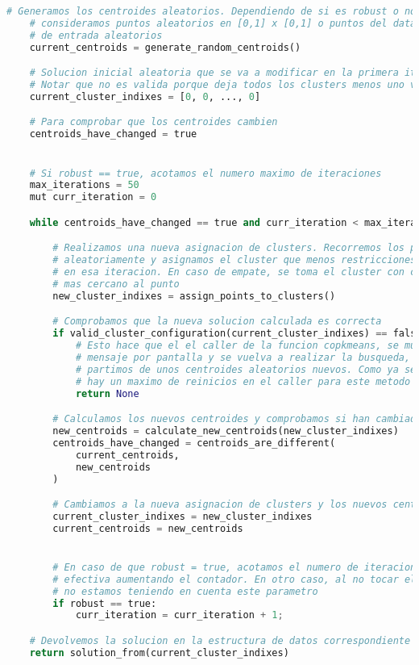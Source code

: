 \documentclass[11pt]{article}
\begin{document}
    \begin{lstlisting}[language=Python, style=Boxed]
    # Generamos los centroides aleatorios. Dependiendo de si es robust o no
    # consideramos puntos aleatorios en [0,1] x [0,1] o puntos del dataset
    # de entrada aleatorios
    current_centroids = generate_random_centroids()

    # Solucion inicial aleatoria que se va a modificar en la primera iteracion
    # Notar que no es valida porque deja todos los clusters menos uno vacíos
    current_cluster_indixes = [0, 0, ..., 0]

    # Para comprobar que los centroides cambien
    centroids_have_changed = true


    # Si robust == true, acotamos el numero maximo de iteraciones
    max_iterations = 50
    mut curr_iteration = 0

    while centroids_have_changed == true and curr_iteration < max_iterations{

        # Realizamos una nueva asignacion de clusters. Recorremos los puntos
        # aleatoriamente y asignamos el cluster que menos restricciones viole
        # en esa iteracion. En caso de empate, se toma el cluster con centroide
        # mas cercano al punto
        new_cluster_indixes = assign_points_to_clusters()

        # Comprobamos que la nueva solucion calculada es correcta
        if valid_cluster_configuration(current_cluster_indixes) == false:
            # Esto hace que el el caller de la funcion copkmeans, se muestre un
            # mensaje por pantalla y se vuelva a realizar la busqueda, con lo que
            # partimos de unos centroides aleatorios nuevos. Como ya se ha comentado,
            # hay un maximo de reinicios en el caller para este metodo
            return None

        # Calculamos los nuevos centroides y comprobamos si han cambiado
        new_centroids = calculate_new_centroids(new_cluster_indixes)
        centroids_have_changed = centroids_are_different(
            current_centroids,
            new_centroids
        )

        # Cambiamos a la nueva asignacion de clusters y los nuevos centroides
        current_cluster_indixes = new_cluster_indixes
        current_centroids = new_centroids


        # En caso de que robust = true, acotamos el numero de iteraciones de forma
        # efectiva aumentando el contador. En otro caso, al no tocar el contador
        # no estamos teniendo en cuenta este parametro
        if robust == true:
            curr_iteration = curr_iteration + 1;

    # Devolvemos la solucion en la estructura de datos correspondiente
    return solution_from(current_cluster_indixes)
    \end{lstlisting}
\end{document}
